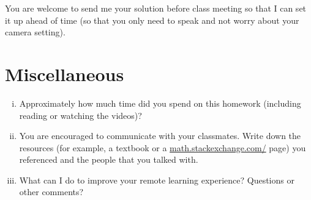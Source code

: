 \documentclass[10pt]{amsart}
\begin{document}
You are welcome to send me your solution before class meeting so that I can set it up ahead of time (so that you only need to speak and not worry about your camera setting).






\section{Miscellaneous}
\begin{enumerate}[i.]  
\item Approximately how much time did you spend on this homework (including reading or watching the videos)?
\item You are encouraged to communicate with your classmates. Write down the resources (for example, a textbook or a  \href{https://math.stackexchange.com/}{math.stackexchange.com/} page) you referenced and the people that you talked with.	
\item 
What can I do to improve your remote learning experience? 
Questions or other comments?
\end{enumerate}
\end{document}
